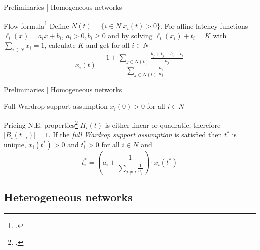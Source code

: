 \documentclass{beamer}
\begin{document}
\begin{frame}{Preliminaries | Homogeneous networks}
	\begin{block}{Flow formula\footcite{Harks_2019}}
		Define $N(t) = \{i \in N | x_i(t) > 0\}$.
		For affine latency functions $\ell_i(x) = a_i x + b_i$, $a_i > 0, b_i \ge 0$ and by solving $\ell_i(x_i) + t_i = K$ with $\sum_{i \in N} x_i = 1$, calculate $K$ and get for all $i \in N$
		\begin{equation*}
			x_i(t) = \frac{1 + \sum_{j \in N(t)}\frac{b_j + t_j - b_i - t_i}{a_j}}{\sum_{j \in N(t)}\frac{a_i}{a_j}}
		\end{equation*}
	\end{block}
\end{frame}

\begin{frame}{Preliminaries | Homogeneous networks}
	\begin{block}{Full Wardrop support assumption}
		$x_i(0) > 0$ for all $i \in N$
	\end{block}
	\begin{block}{Pricing N.E. properties\footcite{Harks_2019}}
		$\Pi_i(t)$ is either linear or quadratic, therefore $|B_i(t_{-i})| = 1$.
		If the \textit{full Wardrop support assumption} is satisfied then $t^*$ is unique, $x_i(t^*) > 0$ and $t_i^* > 0$ for all $i \in N$ and
		\begin{equation*}
			t_i^* = \left(a_i + \frac{1}{\sum_{j \ne i} \frac{1}{a_j}}\right) \cdot x_i(t^*)
		\end{equation*}
	\end{block}
\end{frame}


\subsection{Heterogeneous networks}
\end{document}
